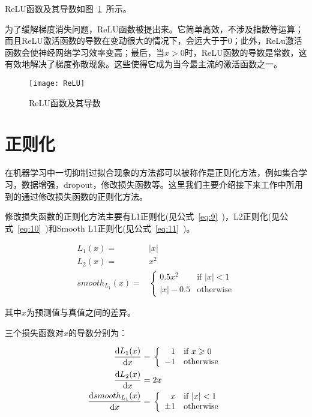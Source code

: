 ReLU函数及其导数如图~\ref{piture:10}~所示。

为了缓解梯度消失问题，ReLU函数被提出来。它简单高效，不涉及指数等运算；而且ReLU激活函数的导数在变动很大的情况下，会远大于于$0$；此外，ReLu激活函数会使神经网络学习效率变高；最后，当$x>0$时，ReLU函数的导数是常数，这有效地解决了梯度弥散现象。这些使得它成为当今最主流的激活函数之一。

\begin{figure}[h]
\centering
\texttt{[image: ReLU]}
\caption{ReLU函数及其导数}
\label{piture:10}
\end{figure}

\section{正则化}

在机器学习中一切抑制过拟合现象的方法都可以被称作是正则化方法，例如集合学习，数据增强，dropout，修改损失函数等。这里我们主要介绍接下来工作中所用到的通过修改损失函数的正则化方法。

修改损失函数的正则化方法主要有L1正则化(见公式~\ref{eq:9}~)，L2正则化(见公式~\ref{eq:10}~)和Smooth L1正则化(见公式~\ref{eq:11}~)。


\begin{align}
L_1(x) ={} & |x| \label{eq:9}\\
L_2(x) ={} & x^2 \label{eq:10}\\
smooth_{L_1}(x) ={} & \left\{
\begin{array}{rl}
\label{eq:11}
0.5x^2 & \text{if } |x| < 1\\
|x|-0.5 & \text{otherwise}
\end{array}\right.
\end{align}

其中$x$为预测值与真值之间的差异。

三个损失函数对$x$的导数分别为：

\begin{align}
\frac{\mathop{}\!\mathrm{d} L_1(x)}{\mathop{}\!\mathrm{d} x} ={} & \left\{
\begin{array}{rl}
\label{eq:12}
1 & \text{if } x \geqslant 0\\
-1 & \text{otherwise}
\end{array}\right.\\
\frac{\mathop{}\!\mathrm{d} L_2(x)}{\mathop{}\!\mathrm{d} x} ={} & 2x \label{eq:13}\\
\frac{\mathop{}\!\mathrm{d} smooth_{L_1}(x)}{\mathop{}\!\mathrm{d} x} ={} & \left\{
\begin{array}{rl}
\label{eq:14}
x & \text{if } |x| < 1\\
\pm 1 & \text{otherwise}
\end{array}\right.
\end{align}

